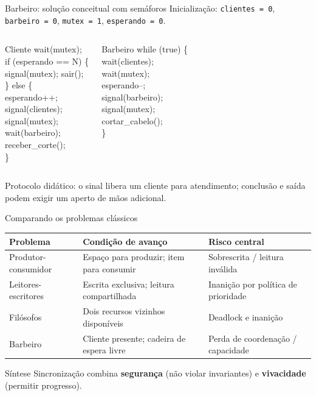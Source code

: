 \documentclass[aspectratio=169,11pt]{beamer}
\begin{document}
\begin{frame}[fragile]{Barbeiro: solução conceitual com semáforos}
\small
Inicialização: \texttt{clientes = 0}, \texttt{barbeiro = 0}, \texttt{mutex = 1}, \texttt{esperando = 0}.
\vspace{0.15cm}
\begin{columns}[T,onlytextwidth]
\begin{block}{Cliente}
\ttfamily\scriptsize
wait(mutex);\\
if (esperando == N) \{\\
\quad signal(mutex); sair();\\
\} else \{\\
\quad esperando++;\\
\quad signal(clientes);\\
\quad signal(mutex);\\
\quad wait(barbeiro);\\
\quad receber\_corte();\\
\}
\end{block}
\begin{block}{Barbeiro}
\ttfamily\scriptsize
while (true) \{\\
\quad wait(clientes);\\
\quad wait(mutex);\\
\quad esperando--;\\
\quad signal(barbeiro);\\
\quad signal(mutex);\\
\quad cortar\_cabelo();\\
\}
\end{block}
\end{columns}
\vspace{0.05cm}
{\scriptsize Protocolo didático: o sinal libera um cliente para atendimento; conclusão e saída podem exigir um aperto de mãos adicional.}
\end{frame}



\begin{frame}{Comparando os problemas clássicos}
\footnotesize
\begin{tabular}{p{2.35cm}p{3.6cm}p{3.85cm}}
\toprule
\textbf{Problema} & \textbf{Condição de avanço} & \textbf{Risco central}\\
\midrule
Produtor-consumidor & Espaço para produzir; item para consumir & Sobrescrita / leitura inválida\\
Leitores-escritores & Escrita exclusiva; leitura compartilhada & Inanição por política de prioridade\\
Filósofos & Dois recursos vizinhos disponíveis & Deadlock e inanição\\
Barbeiro & Cliente presente; cadeira de espera livre & Perda de coordenação / capacidade\\
\bottomrule
\end{tabular}
\vspace{0.3cm}
\begin{block}{Síntese}
Sincronização combina \textbf{segurança} (não violar invariantes) e \textbf{vivacidade} (permitir progresso).
\end{block}
\end{frame}
\end{document}
